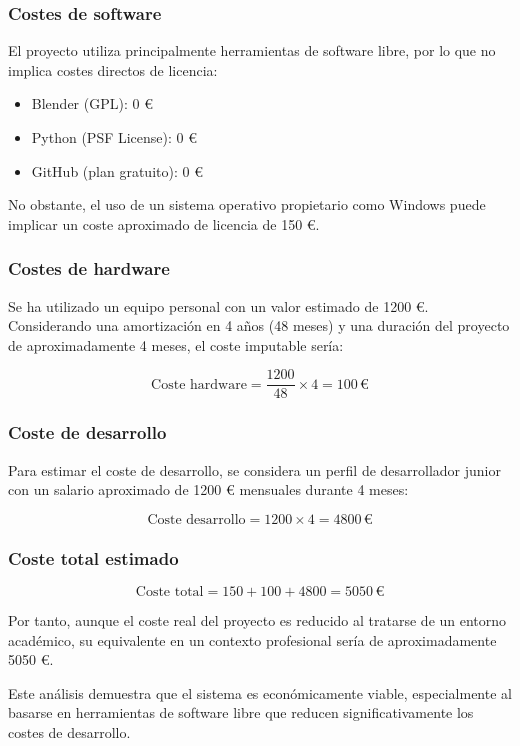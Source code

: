 \subsubsection{Costes de software}

El proyecto utiliza principalmente herramientas de software libre, por lo que no implica costes directos de licencia:

\begin{itemize}
    \item Blender (GPL): 0 €
    \item Python (PSF License): 0 €
    \item GitHub (plan gratuito): 0 €
\end{itemize}

No obstante, el uso de un sistema operativo propietario como Windows puede implicar un coste aproximado de licencia de 150 €.

\subsubsection{Costes de hardware}

Se ha utilizado un equipo personal con un valor estimado de 1200 €. Considerando una amortización en 4 años (48 meses) y una duración del proyecto de aproximadamente 4 meses, el coste imputable sería:

\[
\text{Coste hardware} = \frac{1200}{48} \times 4 = 100 \,€
\]

\subsubsection{Coste de desarrollo}

Para estimar el coste de desarrollo, se considera un perfil de desarrollador junior con un salario aproximado de 1200 € mensuales durante 4 meses:

\[
\text{Coste desarrollo} = 1200 \times 4 = 4800 \,€
\]

\subsubsection{Coste total estimado}

\[
\text{Coste total} = 150 + 100 + 4800 = 5050 \,€
\]

Por tanto, aunque el coste real del proyecto es reducido al tratarse de un entorno académico, su equivalente en un contexto profesional sería de aproximadamente 5050 €.

Este análisis demuestra que el sistema es económicamente viable, especialmente al basarse en herramientas de software libre que reducen significativamente los costes de desarrollo.

